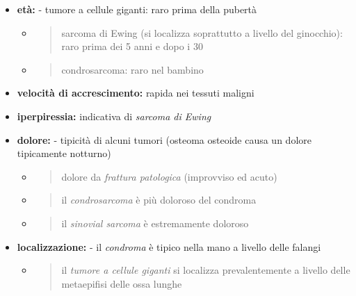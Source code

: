 \documentclass[]{article}
\begin{document}
\begin{itemize}
\item
  \textbf{età:} - tumore a cellule giganti: raro prima della pubertà

  \begin{itemize}
  \item
    \begin{quote}
    sarcoma di Ewing (si localizza soprattutto a livello del ginocchio):
    raro prima dei 5 anni e dopo i 30
    \end{quote}
  \item
    \begin{quote}
    condrosarcoma: raro nel bambino
    \end{quote}
  \end{itemize}
\item
  \textbf{velocità di accrescimento:} rapida nei tessuti maligni
\item
  \textbf{iperpiressia:} indicativa di \emph{sarcoma di Ewing}
\item
  \textbf{dolore:} - tipicità di alcuni tumori (osteoma osteoide causa
  un dolore tipicamente notturno)

  \begin{itemize}
  \item
    \begin{quote}
    dolore da \emph{frattura patologica} (improvviso ed acuto)
    \end{quote}
  \item
    \begin{quote}
    il \emph{condrosarcoma} è più doloroso del condroma
    \end{quote}
  \item
    \begin{quote}
    il \emph{sinovial sarcoma} è estremamente doloroso
    \end{quote}
  \end{itemize}
\end{itemize}

\begin{itemize}
\item
  \textbf{localizzazione:} - il \emph{condroma} è tipico nella mano a
  livello delle falangi

  \begin{itemize}
  \item
    \begin{quote}
    il \emph{tumore a cellule giganti} si localizza prevalentemente a
    livello delle metaepifisi delle ossa lunghe
    \end{quote}
  \end{itemize}
\end{itemize}
\end{document}
